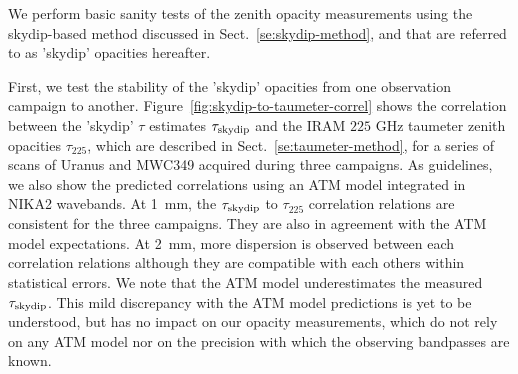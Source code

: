 We perform basic sanity tests of the zenith opacity measurements using
the skydip-based method discussed in Sect.~\ref{se:skydip-method}, and
that are referred to as 'skydip' opacities hereafter.

First, we test the stability of the 'skydip' opacities from one
observation campaign to another.
Figure~\ref{fig:skydip-to-taumeter-correl} shows the
correlation between the 'skydip' $\tau$ estimates $\tau_{\rm{skydip}}$
and the IRAM $225$ GHz taumeter zenith opacities $\tau_{225}$, which
are described in Sect.~\ref{se:taumeter-method}, for a series of scans
of Uranus and MWC349 acquired during three campaigns. As guidelines,
we also show the predicted correlations using an ATM model integrated
in NIKA2 wavebands. At 1~mm, the
$\tau_{\rm{skydip}}$ to $\tau_{225}$ correlation relations are
consistent for the three campaigns. They are
also in agreement with the ATM model expectations. At 2~mm, more
dispersion is observed between each correlation relations although
they are compatible with each others within statistical errors.
We note that the ATM model underestimates the
measured $\tau_{\rm{skydip}}$. This mild discrepancy with the
ATM model predictions is yet to be understood, but has no impact on
our opacity measurements, which do not rely on any ATM model nor on
the precision with which the observing bandpasses are known.


